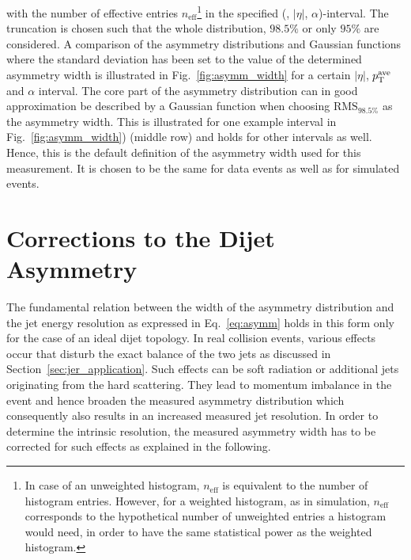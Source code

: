 with the number of effective entries $n_\mathrm{eff}$\footnote{In case of an unweighted histogram, $n_\mathrm{eff}$ is equivalent to the number of histogram entries. However, for a weighted histogram, as \eg in simulation, $n_\mathrm{eff}$ corresponds to the hypothetical number of unweighted entries a histogram would need, in order to have the same statistical power as the weighted histogram.} in the specified (\ptave, $|\eta|$, $\alpha$)-interval. The truncation is chosen such that the whole distribution, $98.5\%$ or only $95\%$ are considered. A comparison of the asymmetry distributions and Gaussian functions where the standard deviation has been set to the value of the determined asymmetry width is illustrated in Fig.~\ref{fig:asymm_width} for a certain $|\eta|$, $p_{\text{T}}^\mathrm{ave}$ and $\alpha$ interval. The core part of the asymmetry distribution can in good approximation be described by a Gaussian function when choosing $\mathrm{RMS}_{98.5\%}$ as the asymmetry width. This is illustrated for one example interval in Fig.~\ref{fig:asymm_width}) (middle row) and holds for other intervals as well. Hence, this is the default definition of the asymmetry width used for this measurement. It is chosen to be the same for data events as well as for simulated events.  

\section{Corrections to the Dijet Asymmetry}
\label{sec:jer_corrections}
The fundamental relation between the width of the asymmetry distribution and the jet energy resolution as expressed in Eq.~\ref{eq:asymm} holds in this form only for the case of an ideal dijet topology. In real collision events, various effects occur that disturb the exact balance of the two jets as discussed in Section~\ref{sec:jer_application}. Such effects can be soft radiation or additional jets originating from the hard scattering. They lead to momentum imbalance in the event and hence broaden the measured asymmetry distribution which consequently also results in an increased measured jet resolution. In order to determine the intrinsic resolution, the measured asymmetry width has to be corrected for such effects as explained in the following.

